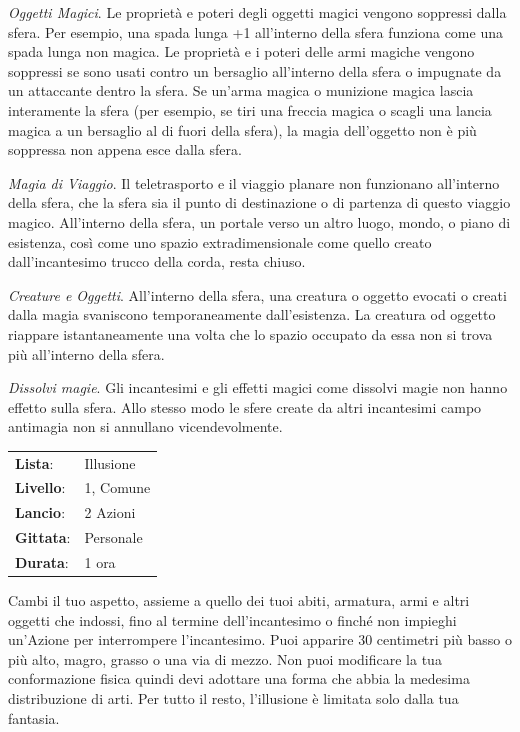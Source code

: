 \begin{multicols}{2}
\emph{Oggetti Magici}. Le proprietà e poteri degli oggetti magici vengono soppressi dalla sfera. Per esempio, una spada lunga +1 all'interno della sfera funziona come una spada lunga non magica. Le proprietà e i poteri delle armi magiche vengono soppressi se sono usati contro un bersaglio all'interno della sfera o impugnate da un attaccante dentro la sfera. Se un'arma magica o munizione magica lascia interamente la sfera (per esempio, se tiri una freccia magica o scagli una lancia magica a un bersaglio al di fuori della sfera), la magia dell'oggetto non è più soppressa non appena esce dalla sfera.

\emph{Magia di Viaggio}. Il teletrasporto e il viaggio planare non funzionano all'interno della sfera, che la sfera sia il punto di destinazione o di partenza di questo viaggio magico. All'interno della sfera, un portale verso un altro luogo, mondo, o piano di esistenza, così come uno spazio extradimensionale come quello creato dall'incantesimo trucco della corda, resta chiuso.

\emph{Creature e Oggetti}. All'interno della sfera, una creatura o oggetto evocati o creati dalla magia svaniscono temporaneamente dall'esistenza. La creatura od oggetto riappare istantaneamente una volta che lo spazio occupato da essa non si trova più all'interno della sfera.

\emph{Dissolvi magie}. Gli incantesimi e gli effetti magici come dissolvi magie non hanno effetto sulla sfera. Allo stesso modo le sfere create da altri incantesimi campo antimagia non si annullano vicendevolmente.

\noindent\begin{tabularx}{\linewidth}{p{1.3cm}X}
	\rowcolor{gray!20}\textbf{Lista}: & Illusione \\
	\textbf{Livello}: & 1, Comune \\
	\rowcolor{gray!20}\textbf{Lancio}: & 2 Azioni \\
	\textbf{Gittata}: & Personale \\
	\rowcolor{gray!20}\textbf{Durata}: & 1 ora \\
\end{tabularx}\smallskip

Cambi il tuo aspetto, assieme a quello dei tuoi abiti, armatura, armi e altri oggetti che indossi, fino al termine dell'incantesimo o finché non impieghi un'Azione per interrompere l'incantesimo. Puoi apparire 30 centimetri più basso o più alto, magro, grasso o una via di mezzo. Non puoi modificare la tua conformazione fisica quindi devi adottare una forma che abbia la medesima distribuzione di arti. Per tutto il resto, l'illusione è limitata solo dalla tua fantasia.


\end{multicols}
